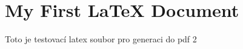 \documentclass{article}
\begin{document}
\section{My First LaTeX Document}

Toto je testovací latex soubor pro generaci do pdf 2
\end{document}
